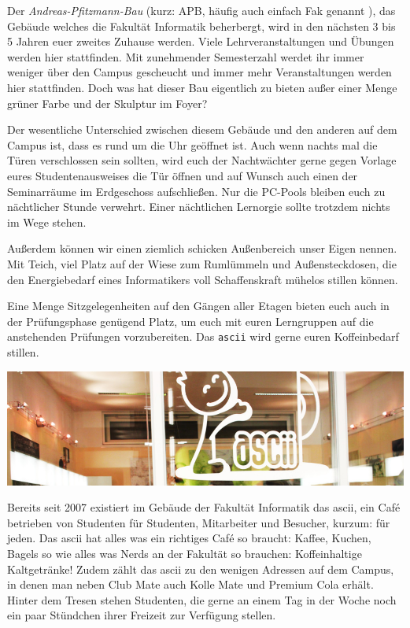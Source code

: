
Der \emph{Andreas-Pfitzmann-Bau} (kurz: APB, häufig auch einfach \glqq{}Fak\grqq{} genannt ), das Gebäude welches die Fakultät Informatik beherbergt, wird in den nächsten 3 bis 5 Jahren euer zweites Zuhause werden.
Viele Lehrveranstaltungen und Übungen werden hier stattfinden. Mit zunehmender Semesterzahl werdet ihr immer weniger über den Campus gescheucht und immer mehr Veranstaltungen werden hier stattfinden.
Doch was hat dieser Bau eigentlich zu bieten außer einer Menge grüner Farbe und der Skulptur im Foyer?

Der wesentliche Unterschied zwischen diesem Gebäude und den anderen auf dem Campus ist, dass es rund um die Uhr geöffnet ist. Auch wenn nachts mal die Türen verschlossen sein sollten, wird euch der Nachtwächter gerne gegen Vorlage eures Studentenausweises die Tür öffnen und auf Wunsch auch einen der Seminarräume im Erdgeschoss aufschließen. Nur die PC-Pools bleiben euch zu nächtlicher Stunde verwehrt.
Einer nächtlichen Lernorgie sollte trotzdem nichts im Wege stehen.

Außerdem können wir einen ziemlich schicken Außenbereich unser Eigen nennen. Mit Teich, viel Platz auf der Wiese zum Rumlümmeln und Außensteckdosen, die den Energiebedarf eines Informatikers voll Schaffenskraft mühelos stillen können.

Eine Menge Sitzgelegenheiten auf den Gängen aller Etagen bieten euch auch in der Prüfungsphase genügend Platz, um euch mit euren Lerngruppen auf die anstehenden Prüfungen vorzubereiten. Das \texttt{ascii} wird gerne euren Koffeinbedarf stillen.



\pagebreak


\includegraphics[width=\linewidth]{img/ascii.jpg}

Bereits seit 2007 existiert im Gebäude der Fakultät Informatik das ascii, ein Café betrieben von Studenten für Studenten, Mitarbeiter und Besucher, kurzum: für jeden.
Das ascii hat alles was ein richtiges Café so braucht: Kaffee, Kuchen, Bagels so wie alles was Nerds an der Fakultät so brauchen: Koffeinhaltige Kaltgetränke!
Zudem zählt das ascii zu den wenigen Adressen auf dem Campus, in denen man neben Club Mate auch Kolle Mate und Premium Cola erhält.
Hinter dem Tresen stehen Studenten, die gerne an einem Tag in der Woche noch ein paar Stündchen ihrer Freizeit zur Verfügung stellen.


